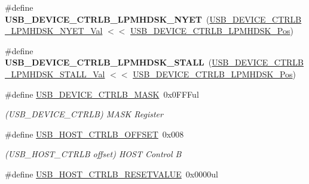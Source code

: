 \begin{DoxyCompactItemize}
\item 
\hypertarget{group___s_a_m_l21___u_s_b_ga184fbecd92429ec768805a0279460aa3}{}\#define {\bfseries U\+S\+B\+\_\+\+D\+E\+V\+I\+C\+E\+\_\+\+C\+T\+R\+L\+B\+\_\+\+L\+P\+M\+H\+D\+S\+K\+\_\+\+N\+Y\+E\+T}~(\hyperlink{group___s_a_m_l21___u_s_b_ga7f5bfd93b23484ad9c4619c32ebe8389}{U\+S\+B\+\_\+\+D\+E\+V\+I\+C\+E\+\_\+\+C\+T\+R\+L\+B\+\_\+\+L\+P\+M\+H\+D\+S\+K\+\_\+\+N\+Y\+E\+T\+\_\+\+Val} $<$$<$ \hyperlink{group___s_a_m_l21___u_s_b_ga7bbe2998f650533b2cc87bb63f7a28de}{U\+S\+B\+\_\+\+D\+E\+V\+I\+C\+E\+\_\+\+C\+T\+R\+L\+B\+\_\+\+L\+P\+M\+H\+D\+S\+K\+\_\+\+Pos})\label{group___s_a_m_l21___u_s_b_ga184fbecd92429ec768805a0279460aa3}

\item 
\hypertarget{group___s_a_m_l21___u_s_b_ga1800abe64ec717b65d4b17a21bd85345}{}\#define {\bfseries U\+S\+B\+\_\+\+D\+E\+V\+I\+C\+E\+\_\+\+C\+T\+R\+L\+B\+\_\+\+L\+P\+M\+H\+D\+S\+K\+\_\+\+S\+T\+A\+L\+L}~(\hyperlink{group___s_a_m_l21___u_s_b_ga249000ba2e98b6207cbb2176465bf154}{U\+S\+B\+\_\+\+D\+E\+V\+I\+C\+E\+\_\+\+C\+T\+R\+L\+B\+\_\+\+L\+P\+M\+H\+D\+S\+K\+\_\+\+S\+T\+A\+L\+L\+\_\+\+Val} $<$$<$ \hyperlink{group___s_a_m_l21___u_s_b_ga7bbe2998f650533b2cc87bb63f7a28de}{U\+S\+B\+\_\+\+D\+E\+V\+I\+C\+E\+\_\+\+C\+T\+R\+L\+B\+\_\+\+L\+P\+M\+H\+D\+S\+K\+\_\+\+Pos})\label{group___s_a_m_l21___u_s_b_ga1800abe64ec717b65d4b17a21bd85345}

\item 
\hypertarget{group___s_a_m_l21___u_s_b_gaf8a3a39289b6927db2d06bad0f135d42}{}\#define \hyperlink{group___s_a_m_l21___u_s_b_gaf8a3a39289b6927db2d06bad0f135d42}{U\+S\+B\+\_\+\+D\+E\+V\+I\+C\+E\+\_\+\+C\+T\+R\+L\+B\+\_\+\+M\+A\+S\+K}~0x0\+F\+F\+Ful\label{group___s_a_m_l21___u_s_b_gaf8a3a39289b6927db2d06bad0f135d42}

\begin{DoxyCompactList}\small\item\em (U\+S\+B\+\_\+\+D\+E\+V\+I\+C\+E\+\_\+\+C\+T\+R\+L\+B) M\+A\+S\+K Register \end{DoxyCompactList}\item 
\hypertarget{group___s_a_m_l21___u_s_b_gab7ae7f7cbb730982b59882020535f25a}{}\#define \hyperlink{group___s_a_m_l21___u_s_b_gab7ae7f7cbb730982b59882020535f25a}{U\+S\+B\+\_\+\+H\+O\+S\+T\+\_\+\+C\+T\+R\+L\+B\+\_\+\+O\+F\+F\+S\+E\+T}~0x008\label{group___s_a_m_l21___u_s_b_gab7ae7f7cbb730982b59882020535f25a}

\begin{DoxyCompactList}\small\item\em (U\+S\+B\+\_\+\+H\+O\+S\+T\+\_\+\+C\+T\+R\+L\+B offset) H\+O\+S\+T Control B \end{DoxyCompactList}\item 
\hypertarget{group___s_a_m_l21___u_s_b_ga9ca869733032951271ebefd0cdb41838}{}\#define \hyperlink{group___s_a_m_l21___u_s_b_ga9ca869733032951271ebefd0cdb41838}{U\+S\+B\+\_\+\+H\+O\+S\+T\+\_\+\+C\+T\+R\+L\+B\+\_\+\+R\+E\+S\+E\+T\+V\+A\+L\+U\+E}~0x0000ul\label{group___s_a_m_l21___u_s_b_ga9ca869733032951271ebefd0cdb41838}


\end{DoxyCompactItemize}
